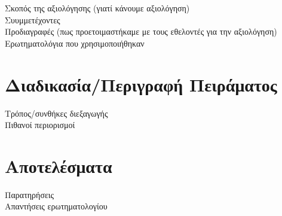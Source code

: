 
Σκοπός της αξιολόγησης (γιατί κάνουμε αξιολόγηση)\\
Συυμμετέχοντες\\
Προδιαγραφές (πως προετοιμαστήκαμε με τους εθελοντές για την αξιολόγηση)\\
Ερωτηματολόγια που χρησιμοποιήθηκαν


\section{Διαδικασία/Περιγραφή Πειράματος}
Τρόπος/συνθήκες διεξαγωγής\\
Πιθανοί περιορισμοί

\section{Αποτελέσματα}
Παρατηρήσεις\\
Απαντήσεις ερωτηματολογίου


